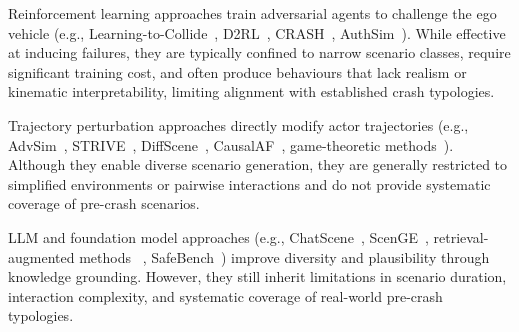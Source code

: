 Reinforcement learning approaches train adversarial agents to challenge the ego vehicle (e.g., Learning-to-Collide~\cite{ding_learning_2020}, D2RL~\cite{feng_dense_2023}, CRASH~\cite{kulkarni_crash_2024}, AuthSim~\cite{yang_authsim_2025}). While effective at inducing failures, they are typically confined to narrow scenario classes, require significant training cost, and often produce behaviours that lack realism or kinematic interpretability, limiting alignment with established crash typologies.

Trajectory perturbation approaches directly modify actor trajectories (e.g., AdvSim~\cite{wang_advsim_2023}, STRIVE~\cite{rempe_generating_2022}, DiffScene~\cite{xu_diffscene_2025}, CausalAF~\cite{ding_causalaf_2023}, game-theoretic methods~\cite{lin_scenario-based_2025}). Although they enable diverse scenario generation, they are generally restricted to simplified environments or pairwise interactions and do not provide systematic coverage of pre-crash scenarios.

LLM and foundation model approaches (e.g., ChatScene~\cite{zhang_chatscene_2024}, ScenGE~\cite{liu_adversarial_2025}, retrieval-augmented methods~\cite{mei_seeking_2025} , SafeBench~\cite{xu_safebench_2022}) improve diversity and plausibility through knowledge grounding. However, they still inherit limitations in scenario duration, interaction complexity, and systematic coverage of real-world pre-crash typologies.